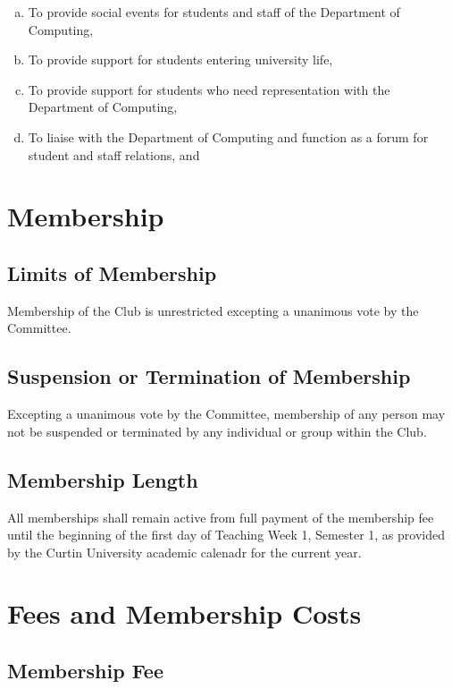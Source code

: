 \documentclass[a4paper,12pt]{article}
\begin{document}
\begin{enumerate}[a)]
	\item To provide social events for students and staff of the Department of Computing,
	\item To provide support for students entering university life,
	\item To provide support for students who need representation with the Department of Computing,
	\item To liaise with the Department of Computing and function as a forum for student and staff relations, and
\end{enumerate}

\section{Membership}

\subsection{Limits of Membership}

Membership of the Club is unrestricted excepting a unanimous vote by the Committee.

\subsection{Suspension or Termination of Membership}

Excepting a unanimous vote by the Committee, membership of any person may not be suspended or terminated by any individual or group within the Club.

\subsection{Membership Length}

All memberships shall remain active from full payment of the membership fee until the beginning of the first day of Teaching Week 1, Semester 1, as provided by the Curtin University academic calenadr for the current year.

\section{Fees and Membership Costs}

\subsection{Membership Fee}
\end{document}

